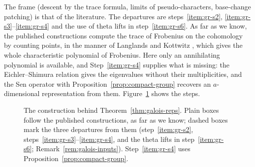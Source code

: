 \documentclass[11pt]{amsbook}
\theoremstyle{plain}
\theoremstyle{definition}
\theoremstyle{remark}
\numberwithin{equation}{section}
\numberwithin{figure}{chapter}
\numberwithin{table}{chapter}
\begin{document}
\noindent The frame (descent by the trace formula, limits of
pseudo-characters, base-change patching) is that of the literature.
The departures are steps~\ref{item:gr-s2}, \ref{item:gr-s3}--\ref{item:gr-s4}
and the use of theta lifts in
step~\ref{item:gr-s6}. As far as we know, the published constructions compute
the
trace of Frobenius on the cohomology by counting points, in the manner
of Langlands and Kottwitz \cite{Kottwitz1992,HarrisTaylor2001,Shin2011},
which gives the whole characteristic polynomial of Frobenius. Here only
an
annihilating polynomial is available, and Step~\ref{item:gr-s4} supplies what is
missing: the Eichler--Shimura relation gives the eigenvalues without
their multiplicities, and the Sen operator with
Proposition~\ref{prop:compact-group} recovers an $a$-dimensional
representation from them. Figure~\ref{fig:galois-route} shows the
steps.

\begin{figure}[htbp]
\centering

\caption{The construction behind Theorem~\ref{thm:galois-reps}. Plain
boxes follow the published constructions, as far as we know; dashed
boxes mark the three departures from them (step~\ref{item:gr-s2},
steps~\ref{item:gr-s3}--\ref{item:gr-s4}, and the theta lifts in
step~\ref{item:gr-s6}; Remark~\ref{rem:galois-inputs}). Step~\ref{item:gr-s4}
uses
Proposition~\ref{prop:compact-group}.}
\label{fig:galois-route}
\end{figure}
\end{document}
